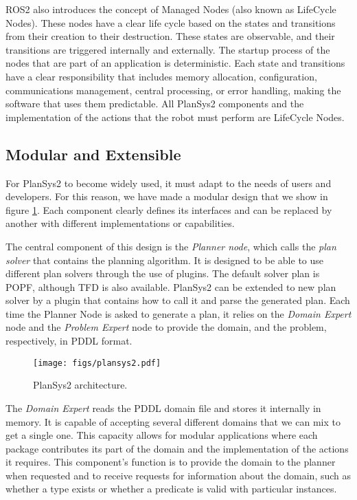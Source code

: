 \documentclass[letterpaper, 10 pt, conference]{IEEEtran}
\begin{document}
ROS2 also introduces the concept of Managed Nodes (also known as LifeCycle Nodes). These nodes have a clear life cycle based on the states and transitions from their creation to their destruction. These states are observable, and their transitions are triggered internally and externally. The startup process of the nodes that are part of an application is deterministic. Each state and transitions have a clear responsibility that includes memory allocation, configuration, communications management, central processing, or error handling, making the software that uses them predictable. All PlanSys2 components and the implementation of the actions that the robot must perform are LifeCycle Nodes.

\subsection{Modular and Extensible}

For PlanSys2 to become widely used, it must adapt to the needs of users and developers. For this reason, we have made a modular design that we show in figure \ref{fig:plansys2}. Each component clearly defines its interfaces and can be replaced by another with different implementations or capabilities.

The central component of this design is the \emph{Planner node}, which calls the \emph{plan solver} that contains the planning algorithm. It is designed to be able to use different plan solvers through the use of plugins. The default solver plan is POPF, although TFD is also available. PlanSys2 can be extended to new plan solver by a plugin that contains how to call it and parse the generated plan. Each time the Planner Node is asked to generate a plan, it relies on the \emph{Domain Expert} node and the \emph{Problem Expert} node to provide the domain, and the problem, respectively, in PDDL format.

\begin{figure}[tb]
  \centering
  \texttt{[image: figs/plansys2.pdf]}
  \caption{PlanSys2 architecture.}
  \label{fig:plansys2}
\end{figure}

The \emph{Domain Expert} reads the PDDL domain file and stores it internally in memory. It is capable of accepting several different domains that we can mix to get a single one. This capacity allows for modular applications where each package contributes its part of the domain and the implementation of the actions it requires. This component's function is to provide the domain to the planner when requested and to receive requests for information about the domain, such as whether a type exists or whether a predicate is valid with particular instances.
\end{document}
